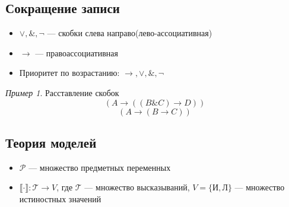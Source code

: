 \documentclass[oneside]{book}
\newcommand{\llb}{\llbracket}
\newcommand{\rrb}{\rrbracket}
\theoremstyle{plain}
\theoremstyle{remark}
\newtheorem*{examp}{Пример}
\theoremstyle{definition}
\begin{document}
\subsection{Сокращение записи}
\label{sec:org5c5037a}
\begin{itemize}
\item \(\vee, \&, \neg\) --- скобки слева направо(лево-ассоциативная)
\item \(\to\) --- правоассоциативная
\item Приоритет по возрастанию: \(\to, \vee, \&, \neg\)
\end{itemize}
\begin{examp}
Расставление скобок
\[ \left(A \to \left( \left(B \& C\right) \to D\right)\right) \]
\[ \left(A \to \left(B \to C\right)\right) \]
\end{examp}
\subsection{Теория моделей}
\label{sec:org2b1a160}
\begin{itemize}
\item \(\mathcal{P}\) --- множество предметных переменных
\item \(\llb\cdot\rrb: \mathcal{T} \to V\), где \(\mathcal{T}\) --- множество высказываний, \(V = \{\text{И}, \text{Л}\}\) --- множество истиностных значений
\end{itemize}
\end{document}
